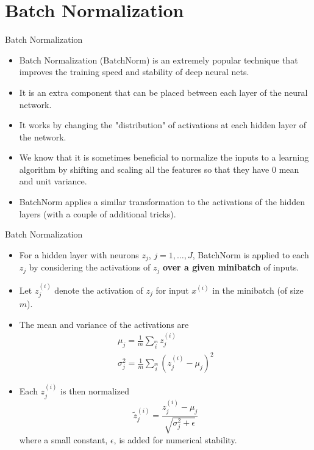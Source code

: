 \section{Batch Normalization}

\begin{frame} {Batch Normalization}
  \begin{itemize}
    \item Batch Normalization (BatchNorm) is an extremely popular technique that improves the training speed and stability of deep neural nets.
    \item It is an extra component that can be placed between each layer of the neural network.
    \item It works by changing the "distribution" of activations at each hidden layer of the network.
    \item We know that it is sometimes beneficial to normalize the inputs to a learning algorithm by shifting and scaling all the features so that they have 0 mean and unit variance.
    \item%
     BatchNorm applies a similar transformation to the activations of the hidden layers (with a couple of additional tricks).
  \end{itemize}
\end{frame}

\begin{frame} {Batch Normalization}
  \begin{itemize}
    \item For a hidden layer with neurons $z_j$, $j=1, \dots, J$, BatchNorm is applied to each $z_j$ by considering the activations of $z_j$ \textbf{over a given minibatch} of inputs.
    \item Let $z_j^{(i)}$ denote the activation of $z_j$ for input $x^{(i)}$ in the minibatch (of size $m$).
    \item The mean and variance of the activations are
      \begin{equation*}
          \begin{array}{l}
            \mu_j = \frac{1}{m} \sum \limits_i \limits^m z_j^{(i)} \\
            \sigma^2_j = \frac{1}{m} \sum \limits_i \limits^m (z_j^{(i)} - \mu_j)^2
          \end{array}
      \end{equation*}
    \item Each $z_j^{(i)}$ is then normalized 
        \begin{equation*}
          \tilde z_j^{(i)} = \frac {z_j^{(i)} - \mu_j}{\sqrt{\sigma^2_j + \epsilon}}
        \end{equation*}
        where a small constant, $\epsilon$, is added for numerical stability.
  \end{itemize}
\end{frame}


